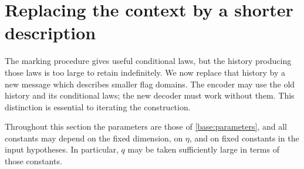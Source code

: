 \section{Replacing the context by a shorter description}
\label{comp:section}

The marking procedure gives useful conditional laws, but the history
producing those laws is too large to retain indefinitely. We now replace
that history by a new message which describes smaller flag domains.
The encoder may use the old history and its conditional laws; the new
decoder must work without them. This distinction is essential to
iterating the construction.

Throughout this section the parameters are those of
\eqref{base:parameters}, and all constants may depend on the fixed
dimension, on \(\eta\), and on fixed constants in the input hypotheses.
In particular, \(q\) may be taken sufficiently large in terms of those
constants.

